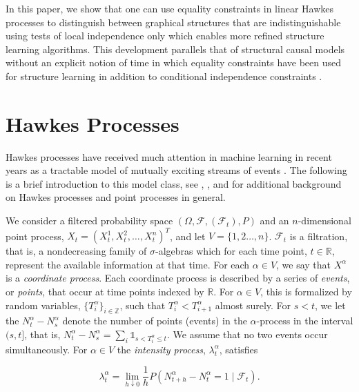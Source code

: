 \documentclass[accepted]{uai2021} %
\begin{document}
In this paper, we show that one can 
use equality 
constraints in linear Hawkes processes to distinguish between graphical 
structures that 
are indistinguishable using tests of local independence only which enables more 
refined structure learning algorithms. This development parallels that of 
structural causal models without an explicit notion of 
time in which equality constraints have 
been used for structure learning in addition to conditional independence 
constraints 
\citep{robins1986,vermaEquiAndSynthesis,robins1999,tian2002,shpitser2014,richardson2017}.



\section{Hawkes Processes}
\label{sec:hawPro}

Hawkes processes have received much attention in machine learning in recent 
years as a tractable model of mutually exciting streams of events 
\citep{zhou2013b,luo2015,etesami2016,tan2018,xu2018,trouleau2019}. 
The following is a brief introduction to this model class,
see \cite{laubHawkes2015}, \cite{linigerThesis}, and \cite{daleyVere} for 
additional background on Hawkes processes and point processes in general.

We consider a filtered probability space $(\Omega, \mathcal{F}, 
(\mathcal{F}_t), P)$ and an $n$-dimensional point process, $X_t = 
(X_t^1,X_t^2,\ldots,X_t^n)^T$, and let $V= \{1,2\ldots, n\}$. $\mathcal{F}_t$ 
is 
a filtration, that is, a nondecreasing family of $\sigma$-algebras which for 
each time point, $t\in \mathbb{R}$, represent the available information at 
that time. For each 
$\alpha\in 
V$, we say that $X^\alpha$ is a \emph{coordinate process}. Each coordinate 
process is described by a series of \emph{events}, or \emph{points}, that occur 
at time points indexed by $\mathbb{R}$. For $\alpha \in V$, this is formalized 
by random variables, $\{T_i^\alpha\}_{i\in\mathbb{Z}}$, such 
that $T_i^\alpha < T_{i+1}^\alpha$ almost surely. For $s<t$, we let the  
$N_t^\alpha - 
N_s^\alpha$ denote the number of points (events) in the $\alpha$-process 
in the interval $(s,t]$, that is,  $N_t^\alpha - 
N_s^\alpha= \sum_i \mathds{1}_{s < T_i^\alpha \leq t}$. We 
assume that no 
two events occur simultaneously. For 
$\alpha\in V$ the \emph{intensity process}, $\lambda_t^\alpha$, 
satisfies

$$
\lambda_t^{\alpha} = \lim_{h \downarrow 0} \dfrac{1}{h} P(N_{t + h}^\alpha  - 
N_t^\alpha = 1
\mid \mathcal{F}_t).
$$
\end{document}

